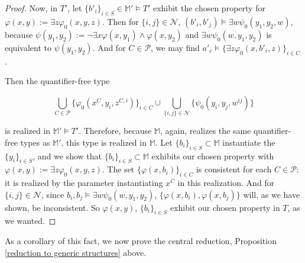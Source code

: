 \documentclass{amsart}
\theoremstyle{definition}
\theoremstyle{remark}
\numberwithin{equation}{section}
\begin{document}
\begin{proof}
Now, in $T'$, let $\{b'_{i}\}_{i \in S} \in \mathbb{M}' \models T'$ exhibit the chosen property for $\varphi(x, y) := \exists z \varphi_{0}(x, y, z)$.   Then for $\{i, j\} \in \mathcal{N}$, $(b'_{i},b'_{j}) \models \exists w \psi_{0}(y_1, y_2, w)$, because $\psi(y_{1}, y_{2}):=\neg \exists x \varphi(x, y_{1}) \wedge \varphi(x, y_{2})$ and $\exists w \psi_{0}(w, y_{1}, y_{2})$ is equivalent to $\psi(y_{1}, y_{2})$. And for $C \in \mathcal{P}$, we may find $a'_{c} \models \{\exists z \varphi_{0}(x, b'_i, z)\}_{i \in C}$.

Then the quantifier-free type



$$\bigcup_{C \in \mathcal{P}}  \{ \varphi_{0}(x^{C}, y_i, z^{C, i})\}_{i \in C} \cup \bigcup_{\{i, j\} \in \mathcal{N}} \{\psi_{0}(y_i, y_j, w^{ij})\}$$


is realized in $\mathbb{M}' \models T'$. Therefore, because $\mathbb{M}$, again, realizes the same quantifier-free types as $\mathbb{M}'$, this type is realized in $\mathbb{M}$. Let $\{b_{i}\}_{i \in S} \subset \mathbb{M}$ instantiate the $\{y_{i}\}_{i \in S}$, and we show that $\{b_{i}\}_{i \in S} \subset \mathbb{M}$ exhibits our chosen property with $\varphi(x, y) := \exists z \varphi_{0}(x, y, z)$. The set $\{\varphi(x, b_{i})\}_{i \in C}$ is consistent for each $C \in \mathcal{P}$: it is realized by the parameter instantiating $x^{C}$ in this realization. And for $\{i, j\} \in \mathcal{N}$, since $b_{i}, b_{j} \models \exists w \psi_{0}(w, y_{1}, y_{2})$, $\{\varphi(x, b_{i}), \varphi(x, b_{j}) \}$ will, as we have shown, be inconsistent. So $\varphi(x, y)$, $\{b_{i}\}_{i \in S}$ exhibit our chosen property in $T$, as we wanted.
\end{proof}

As a corollary of this fact, we now prove the central reduction, Proposition \ref{reduction to generic structures} above.
\end{document}
